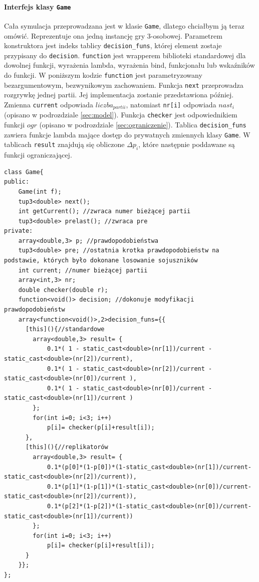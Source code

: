 \paragraph{Interfejs klasy \texttt{Game}}
Cała symulacja przeprowadzana jest w klasie \texttt{Game}, dlatego chciałbym ją teraz omówić. Reprezentuje ona jedną instancję gry 3-osobowej. Parametrem konstruktora jest indeks tablicy \texttt{decision\_funs}, której element zostaje przypisany do \texttt{decision}. \texttt{function} jest wrapperem biblioteki standardowej dla dowolnej funkcji, wyrażenia lambda, wyrażenia bind, funkcjonału lub wskaźników do funkcji. W poniższym kodzie \texttt{function} jest parametryzowany bezargumentowym, bezwynikowym zachowaniem. Funkcja \texttt{next} przeprowadza rozgrywkę jednej partii. Jej implementacja zostanie przedstawiona później. Zmienna \texttt{current} odpowiada $liczba_{partii}$, natomiast \texttt{nr[i]} odpowiada $nast_i$ (opisano w podrozdziale \ref{sec:model}). Funkcja \texttt{checker} jest odpowiednikiem funkcji $ogr$ (opisano w podrozdziale \ref{sec:ograniczenie}). Tablica \texttt{decision\_funs} zawiera funkcje lambda mające dostęp do prywatnych zmiennych klasy \texttt{Game}. W tablicach \texttt{result} znajdują się obliczone $\Delta p_i$, które następnie poddawane są funkcji ograniczającej. 

\begin{lstlisting}
class Game{
public:
    Game(int f);
    tup3<double> next();
    int getCurrent(); //zwraca numer bieżącej partii
    tup3<double> prelast(); //zwraca pre
private:
    array<double,3> p; //prawdopodobieństwa
    tup3<double> pre; //ostatnia krotka prawdopodobieństw na podstawie, których było dokonane losowanie sojuszników
    int current; //numer bieżącej partii
    array<int,3> nr;
    double checker(double r);
    function<void()> decision; //dokonuje modyfikacji prawdopodobieństw
    array<function<void()>,2>decision_funs={{
      [this](){//standardowe
        array<double,3> result= {
            0.1*( 1 - static_cast<double>(nr[1])/current - static_cast<double>(nr[2])/current),
            0.1*( 1 - static_cast<double>(nr[2])/current - static_cast<double>(nr[0])/current ),
            0.1*( 1 - static_cast<double>(nr[0])/current - static_cast<double>(nr[1])/current )
        };
        for(int i=0; i<3; i++)
            p[i]= checker(p[i]+result[i]);
      },
      [this](){//replikatorów
        array<double,3> result= {
            0.1*(p[0]*(1-p[0])*(1-static_cast<double>(nr[1])/current-static_cast<double>(nr[2])/current)),
            0.1*(p[1]*(1-p[1])*(1-static_cast<double>(nr[0])/current-static_cast<double>(nr[2])/current)),
            0.1*(p[2]*(1-p[2])*(1-static_cast<double>(nr[0])/current-static_cast<double>(nr[1])/current))
        };
        for(int i=0; i<3; i++)
            p[i]= checker(p[i]+result[i]);
      }
    }};
};
\end{lstlisting}

